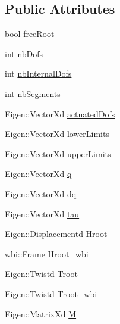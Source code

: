 \subsection*{Public Attributes}
\begin{DoxyCompactItemize}
\item 
bool \hyperlink{structOcraWbiModel_1_1OcraWbiModel__pimpl_ac779ed6d908a6e1773ce4be340bd8182}{free\+Root}
\item 
int \hyperlink{structOcraWbiModel_1_1OcraWbiModel__pimpl_a311221586ff8ca7d778b3c51129f8dd2}{nb\+Dofs}
\item 
int \hyperlink{structOcraWbiModel_1_1OcraWbiModel__pimpl_aa90eceb0093c8efcdb63be8712c3855c}{nb\+Internal\+Dofs}
\item 
int \hyperlink{structOcraWbiModel_1_1OcraWbiModel__pimpl_aae0928d1a4394598af740ab151e0d7db}{nb\+Segments}
\item 
Eigen\+::\+Vector\+Xd \hyperlink{structOcraWbiModel_1_1OcraWbiModel__pimpl_aca1e7991e3aa3941dfb08b58b4f8e82c}{actuated\+Dofs}
\item 
Eigen\+::\+Vector\+Xd \hyperlink{structOcraWbiModel_1_1OcraWbiModel__pimpl_aafa8af9a88392dbb874459894cbf181a}{lower\+Limits}
\item 
Eigen\+::\+Vector\+Xd \hyperlink{structOcraWbiModel_1_1OcraWbiModel__pimpl_a632b9a37d054a1dc6fcf6403e52e62e7}{upper\+Limits}
\item 
Eigen\+::\+Vector\+Xd \hyperlink{structOcraWbiModel_1_1OcraWbiModel__pimpl_a1f83373b2d975e1882ee7812215df997}{q}
\item 
Eigen\+::\+Vector\+Xd \hyperlink{structOcraWbiModel_1_1OcraWbiModel__pimpl_a6584a086fe050dab90cd4f0a0e7e970d}{dq}
\item 
Eigen\+::\+Vector\+Xd \hyperlink{structOcraWbiModel_1_1OcraWbiModel__pimpl_a3dc9c0b3d43f7406a6b89bd2a2af5642}{tau}
\item 
Eigen\+::\+Displacementd \hyperlink{structOcraWbiModel_1_1OcraWbiModel__pimpl_a123381dc5b78bd79aed493801e3e6b35}{Hroot}
\item 
wbi\+::\+Frame \hyperlink{structOcraWbiModel_1_1OcraWbiModel__pimpl_a633b61e128305d5437d8e8c61ae63849}{Hroot\+\_\+wbi}
\item 
Eigen\+::\+Twistd \hyperlink{structOcraWbiModel_1_1OcraWbiModel__pimpl_a7028a65d7121f197364f3e5265387771}{Troot}
\item 
Eigen\+::\+Twistd \hyperlink{structOcraWbiModel_1_1OcraWbiModel__pimpl_acd5e52a21301d36f453dd9a43fc6f50b}{Troot\+\_\+wbi}
\item 
Eigen\+::\+Matrix\+Xd \hyperlink{structOcraWbiModel_1_1OcraWbiModel__pimpl_a56b6cb4adf9dead06b4d09fe38daa26e}{M}

\end{DoxyCompactItemize}
